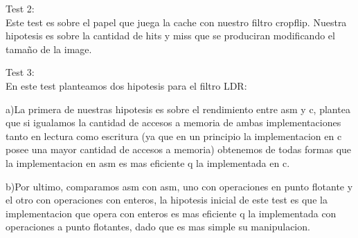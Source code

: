 Test 2:\\
Este test es sobre el papel que juega la cache con nuestro filtro cropflip. Nuestra hipotesis es sobre la cantidad de hits y miss que se produciran modificando el tamaño de la image.


Test 3:\\
En este test planteamos dos hipotesis para el filtro LDR:


a)La primera de nuestras hipotesis es sobre el rendimiento entre asm y c, plantea que si igualamos la cantidad de accesos a memoria de ambas implementaciones tanto en lectura como escritura (ya que en un principio la implementacion en c posee una mayor cantidad de accesos a memoria) obtenemos de todas formas que la implementacion en asm es mas eficiente q la implementada en c.

b)Por ultimo, comparamos asm con asm, uno con operaciones en punto flotante y el otro con operaciones con enteros, la hipotesis inicial de este test es que la implementacion que opera con enteros es mas eficiente q la implementada con operaciones a punto flotantes, dado que es mas simple su manipulacion.
